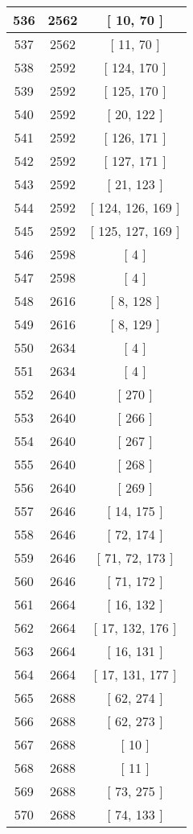 \begin{center}
\begin{longtable}[H]{|| c c c ||}
\hline
536 & 2562 & [ 10, 70 ] \\ 
\hline
537 & 2562 & [ 11, 70 ] \\ 
\hline
538 & 2592 & [ 124, 170 ] \\ 
\hline
539 & 2592 & [ 125, 170 ] \\ 
\hline
540 & 2592 & [ 20, 122 ] \\ 
\hline
541 & 2592 & [ 126, 171 ] \\ 
\hline
542 & 2592 & [ 127, 171 ] \\ 
\hline
543 & 2592 & [ 21, 123 ] \\ 
\hline
544 & 2592 & [ 124, 126, 169 ] \\ 
\hline
545 & 2592 & [ 125, 127, 169 ] \\ 
\hline
546 & 2598 & [ 4 ] \\ 
\hline
547 & 2598 & [ 4 ] \\ 
\hline
548 & 2616 & [ 8, 128 ] \\ 
\hline
549 & 2616 & [ 8, 129 ] \\ 
\hline
550 & 2634 & [ 4 ] \\ 
\hline
551 & 2634 & [ 4 ] \\ 
\hline
552 & 2640 & [ 270 ] \\ 
\hline
553 & 2640 & [ 266 ] \\ 
\hline
554 & 2640 & [ 267 ] \\ 
\hline
555 & 2640 & [ 268 ] \\ 
\hline
556 & 2640 & [ 269 ] \\ 
\hline
557 & 2646 & [ 14, 175 ] \\ 
\hline
558 & 2646 & [ 72, 174 ] \\ 
\hline
559 & 2646 & [ 71, 72, 173 ] \\ 
\hline
560 & 2646 & [ 71, 172 ] \\ 
\hline
561 & 2664 & [ 16, 132 ] \\ 
\hline
562 & 2664 & [ 17, 132, 176 ] \\ 
\hline
563 & 2664 & [ 16, 131 ] \\ 
\hline
564 & 2664 & [ 17, 131, 177 ] \\ 
\hline
565 & 2688 & [ 62, 274 ] \\ 
\hline
566 & 2688 & [ 62, 273 ] \\ 
\hline
567 & 2688 & [ 10 ] \\ 
\hline
568 & 2688 & [ 11 ] \\ 
\hline
569 & 2688 & [ 73, 275 ] \\ 
\hline
570 & 2688 & [ 74, 133 ] \\ 

\end{longtable}
\end{center}
